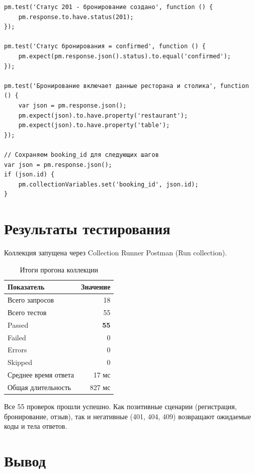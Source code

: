 \documentclass[a4paper,14pt]{extarticle}
\begin{document}
\begin{lstlisting}[style=json, caption={Тест для POST /bookings}]
pm.test('Статус 201 - бронирование создано', function () {
    pm.response.to.have.status(201);
});

pm.test('Статус бронирования = confirmed', function () {
    pm.expect(pm.response.json().status).to.equal('confirmed');
});

pm.test('Бронирование включает данные ресторана и столика', function () {
    var json = pm.response.json();
    pm.expect(json).to.have.property('restaurant');
    pm.expect(json).to.have.property('table');
});

// Сохраняем booking_id для следующих шагов
var json = pm.response.json();
if (json.id) {
    pm.collectionVariables.set('booking_id', json.id);
}
\end{lstlisting}

\section{Результаты тестирования}

Коллекция запущена через Collection Runner Postman (Run collection).

\begin{table}[H]
\centering
\caption{Итоги прогона коллекции}
\begin{tabular}{lr}
\toprule
\textbf{Показатель} & \textbf{Значение} \\
\midrule
Всего запросов       & 18 \\
Всего тестов         & 55 \\
Passed               & \textbf{55} \\
Failed               & 0 \\
Errors               & 0 \\
Skipped              & 0 \\
Среднее время ответа & 17 мс \\
Общая длительность   & 827 мс \\
\bottomrule
\end{tabular}
\end{table}

Все 55 проверок прошли успешно. Как позитивные сценарии (регистрация, бронирование,
отзыв), так и негативные (401, 404, 409) возвращают ожидаемые коды и тела ответов.

\section{Вывод}
\end{document}
